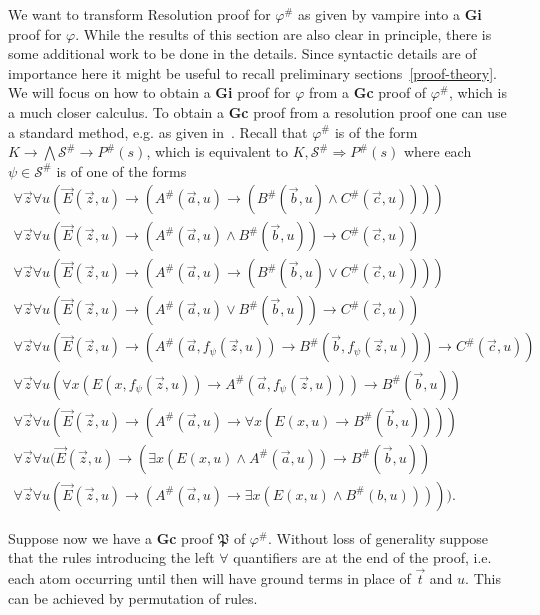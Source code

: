 \documentclass[a4paper,11pt]{report}
\theoremstyle{definition}
\theoremstyle{definition}
\theoremstyle{definition}
\theoremstyle{definition}
\theoremstyle{definition}
\theoremstyle{definition}
\theoremstyle{definition}
\begin{document}
	
	We want to transform Resolution proof for $\varphi^\#$ as given by vampire into a \textbf{Gi} proof for $\varphi$. While the results of this section are also clear in principle, there is some additional work to be done in the details. Since syntactic details are of importance here it might be useful to recall preliminary sections~\ref{proof-theory}. We will focus on how to obtain a \textbf{Gi} proof for $\varphi$ from a \textbf{Gc} proof of $\varphi^\#$, which is a much closer calculus. To obtain a \textbf{Gc} proof from a resolution proof one can use a standard method, e.g. as given in~\cite{de2005translation}.
	Recall that $\varphi^\#$ is of the form $K\to \bigwedge\mathcal S^\#\to P^\#(s)$, which is equivalent to $K,\mathcal S^\#\Rightarrow P^\#(s)$ where each $\psi\in\mathcal S^\#$ is of one of the forms
	\[\begin{matrix}
		\forall \vec z\forall u(\vec E(\vec z, u)\to (A^\#(\vec a, u)\to (B^\#(\vec b, u)\wedge C^\#(\vec c, u))))\\\forall \vec z\forall u(\vec E(\vec z, u)\to (A^\#(\vec a, u)\wedge B^\#(\vec b, u))\to C^\#(\vec c, u))\\ \forall \vec z\forall u(\vec E(\vec z, u)\to (A^\#(\vec a, u)\to (B^\#(\vec b, u)\vee C^\#(\vec c, u))))\\
		\forall \vec z\forall u(\vec E(\vec z, u)\to (A^\#(\vec a, u)\vee B^\#(\vec b, u))\to C^\#(\vec c, u))\\ \forall \vec z\forall u(\vec E(\vec z, u)\to (A^\#(\vec a, f_\psi(\vec z, u))\to B^\#(\vec b, f_\psi(\vec z, u)))\to C^\#(\vec c, u))\\\forall \vec z\forall u(\forall x(E(x, f_\psi(\vec z, u))\to A^\#(\vec a, f_\psi(\vec z, u)))\to B^\#(\vec b, u))\\ \forall \vec z\forall u(\vec E(\vec z, u)\to (A^\#(\vec a, u)\to\forall x(E(x, u)\to B^\#(\vec b, u))))\\ \forall \vec z\forall u(\vec E(\vec z, u)\to (\exists x(E(x, u) \wedge A^\#(\vec a, u))\to B^\#(\vec b, u))\\\forall \vec z\forall u(\vec E(\vec z, u)\to (A^\#(\vec a, u)\to\exists x(E(x, u) \wedge B^\#(b, u))))).
	\end{matrix}\]

	Suppose now we have a \textbf{Gc} proof $\mathfrak P$ of $\varphi^\#$. Without loss of generality suppose that the rules introducing the left $\forall$ quantifiers are at the end of the proof, i.e. each atom occurring until then will have ground terms in place of $\vec t$ and $u$. This can be achieved by permutation of rules.
	
\end{document}
